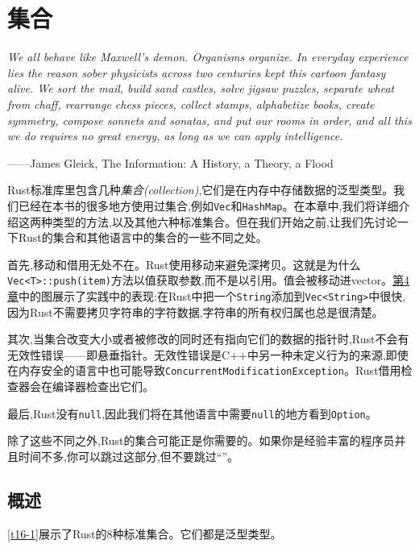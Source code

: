 \chapter{集合}\label{ch16}

\emph{We all behave like Maxwell’s demon. Organisms organize. In everyday experience lies the reason sober physicists across two centuries kept this cartoon fantasy alive. We sort the mail, build sand castles, solve jigsaw puzzles, separate wheat from chaff, rearrange chess pieces, collect stamps, alphabetize books, create symmetry, compose sonnets and sonatas, and put our rooms in order, and all this we do requires no great energy, as long as we can apply intelligence.}

\begin{flushright}
    ——James Gleick, The Information: A History, a Theory, a Flood
\end{flushright}

Rust标准库里包含几种\emph{集合(collection)},它们是在内存中存储数据的泛型类型。我们已经在本书的很多地方使用过集合,例如\texttt{Vec}和\texttt{HashMap}。在本章中,我们将详细介绍这两种类型的方法,以及其他六种标准集合。但在我们开始之前,让我们先讨论一下Rust的集合和其他语言中的集合的一些不同之处。

首先,移动和借用无处不在。Rust使用移动来避免深拷贝。这就是为什么\texttt{Vec<T>::push(item)}方法以值获取参数,而不是以引用。值会被移动进vector。\hyperref[ch04]{第4章}中的图展示了实践中的表现:在Rust中把一个\texttt{String}添加到\texttt{Vec<String>}中很快,因为Rust不需要拷贝字符串的字符数据,字符串的所有权归属也总是很清楚。

其次,当集合改变大小或者被修改的同时还有指向它们的数据的指针时,Rust不会有无效性错误——即悬垂指针。无效性错误是C++中另一种未定义行为的来源,即使在内存安全的语言中也可能导致\texttt{ConcurrentModificationException}。Rust借用检查器会在编译器检查出它们。

最后,Rust没有\texttt{null},因此我们将在其他语言中需要\texttt{null}的地方看到\texttt{Option}。

除了这些不同之外,Rust的集合可能正是你需要的。如果你是经验丰富的程序员并且时间不多,你可以跳过这部分,但不要跳过“”。

\section{概述}

\autoref{t16-1}展示了Rust的8种标准集合。它们都是泛型类型。

